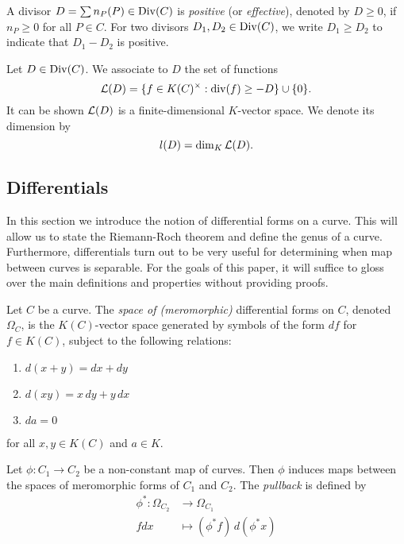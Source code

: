 \begin{definition}
	A divisor $D = \sum n_P(P) \in \operatorname{Div}(C)$ is \emph{positive} (or
	\emph{effective}), denoted by
	$D \geq 0$, if $n_P \geq 0$ for all $P \in C$.
	For two divisors $D_1, D_2 \in \operatorname{Div}(C)$, we write $D_1 \geq D_2$
	to indicate that $D_1 - D_2$ is positive.
\end{definition}

\begin{definition}
	Let $D \in \operatorname{Div}(C)$. We associate to $D$ the set of functions
	\begin{equation*}
		\mathcal{L}(D) = \{f \in K(C)^\times: \operatorname{div}(f) \geq -D\} \cup \{ 0 \}.
	\end{equation*}
	It can be shown $\mathcal{L}(D)$ is a finite-dimensional
	$K$-vector space. We denote its dimension by
	\begin{equation*}
		l(D) = \dim_K \mathcal{L}(D).
	\end{equation*}
\end{definition}

\subsection{Differentials}

In this section we introduce the notion of differential forms on a curve.
This will allow us to state the Riemann-Roch theorem and define the genus of a
curve. Furthermore, differentials turn out to be very useful for determining
when map between curves is separable.
For the goals of this paper, it will suffice to gloss over the main definitions
and properties without providing proofs.

\begin{definition}
	Let $C$ be a curve. 
	The \emph{space of (meromorphic)} differential forms on $C$, denoted
	$\Omega_C$, is the $K(C)$-vector space generated by symbols of the form
	$df$ for $f\in K(C)$, subject to the following relations:
	\begin{enumerate}[itemsep=0em]
		\item $d(x + y) = dx + dy$
		\item $d(xy) = x\,dy + y\,dx$
		\item $da = 0$
	\end{enumerate}
	for all $x, y \in K(C)$ and $a \in K$.
\end{definition}

\begin{definition}
	Let $\phi: C_1 \to C_2$ be a non-constant map of curves. Then $\phi$ induces
	maps between the spaces of meromorphic forms of $C_1$ and $C_2$.
	The \emph{pullback} is defined by
	\begin{align*}
		\phi^*: \Omega_{C_2} &\to \Omega_{C_1}\\
		fdx &\mapsto (\phi^* f)\,d(\phi^* x)
	\end{align*}
\end{definition}

